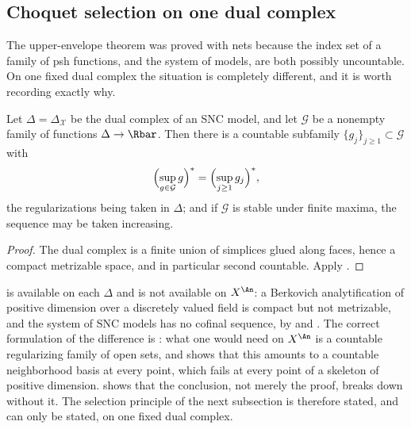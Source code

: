 \subsection{Choquet selection on one dual complex}
\label{sec:ch23-choquet-on-delta}

The upper-envelope theorem was proved with nets because the index set of a
family of psh functions, and the system of models, are both possibly
uncountable.  On one fixed dual complex the situation is completely
different, and it is worth recording exactly why.

\begin{proposition}
\label{prop:ch23-skeleton-choquet}
Let \(\Delta=\Delta_{\mathcal X}\) be the dual complex of an SNC model, and
let \(\mathcal G\) be a nonempty family of functions
\(\Delta\to\Rbar\).  Then there is a countable subfamily
\(\{g_j\}_{j\geq1}\subset\mathcal G\) with
\begin{equation}\label{eq:ch23-choquet-on-delta}
 \Bigl(\sup_{g\in\mathcal G}g\Bigr)^{*}
 =\Bigl(\sup_{j\geq1}g_j\Bigr)^{*} ,
\end{equation}
the regularizations being taken in \(\Delta\); and if \(\mathcal G\) is
stable under finite maxima, the sequence may be taken increasing.
\end{proposition}

\begin{proof}
The dual complex is a finite union of simplices glued along faces, hence a
compact metrizable space, and in particular second countable.  Apply
.
\end{proof}

\begin{remark}
\label{rem:ch23-two-countability-regimes}
 is available on each \(\Delta\) and is not
available on \(X^{\An}\): a Berkovich analytification of positive dimension
over a discretely valued field is compact but not metrizable, and the
system of SNC models has no cofinal sequence, by
 and .  The correct
formulation of the difference is
: what one would need on \(X^{\An}\) is a
countable regularizing family of open sets, and
 shows that this amounts to a countable
neighborhood basis at every point, which fails at every point of a skeleton
of positive dimension.   shows that the
conclusion, not merely the proof, breaks down without it.  The selection
principle of the next subsection is therefore stated, and can only be
stated, on one fixed dual complex.
\end{remark}

